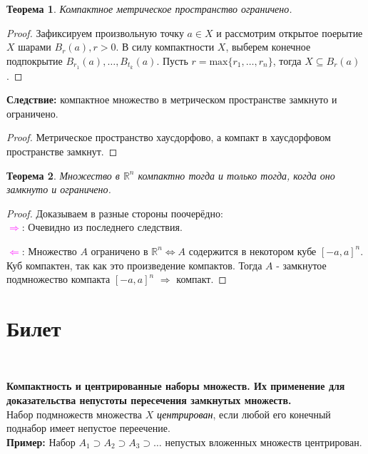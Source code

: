 \documentclass[a4paper,100pt]{article}
\theoremstyle{indented}
\newtheorem{theorem}{Теорема}
\begin{document}
\begin{theorem}
    Компактное метрическое пространство ограничено.
\end{theorem}

\begin{proof} 
    Зафиксируем произвольную точку $a\in X$ и рассмотрим открытое поерытие $X$ шарами $B_r(a), r>0$. В силу компактности $X$, выберем конечное подпокрытие $B_{r_1}(a), \dots, B_{t_k}(a)$. Пусть $r=\text{max}\{r_1,\dots,r_n\}$, тогда $X\subseteq B_r(a)$.
\end{proof}

\textbf{Следствие:} компактное множество в метрическом пространстве замкнуто и ограничено. \

\begin{proof}
    Метрическое пространство хаусдорфово, а компакт в хаусдорфовом пространстве замкнут.
\end{proof}

\begin{theorem}
    Множество в $\mathbb{R}^n$ компактно тогда и только тогда, когда оно замкнуто и ограничено.
\end{theorem}

\begin{proof}
    Доказываем в разные стороны поочерёдно:\\

    \textcolor{magenta}{$\Rightarrow$}: Очевидно из последнего следствия.\
    
    \textcolor{magenta}{$\Leftarrow$}: Множество $A$ ограничено в $\mathbb{R}^n \Leftrightarrow A$ содержится в некотором кубе $[-a,a]^n$. Куб компактен, так как это произведение компактов. Тогда $A$ - замкнутое подмножество компакта $[-a,a]^n$ $\Rightarrow$ компакт.
\end{proof}

\section{Билет} \

\medskip

\textbf{Компактность и центрированные наборы множеств. Их применение для доказательства непустоты пересечения замкнутых множеств.}\\
    
    Набор подмножеств множества $X$ \textit{\textcolor{black}{центрирован}}, если любой его конечный поднабор имеет непустое переечение.\\
    
    \textbf{Пример:} Набор $A_1 \supset A_2 \supset A_3 \supset \dots$ непустых вложенных множеств центрирован.\\
    
\end{document}
